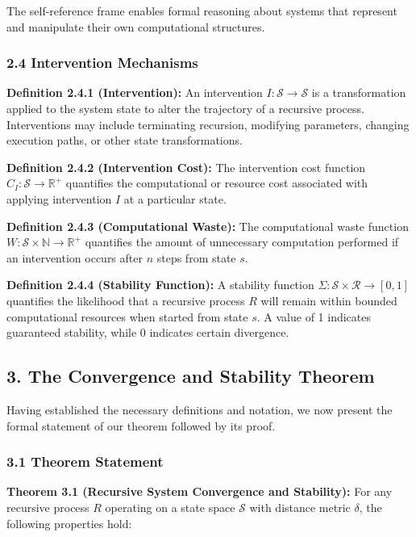 \documentclass[
]{article}
\begin{document}
The self-reference frame enables formal reasoning about systems that
represent and manipulate their own computational structures.

\subsubsection{2.4 Intervention
Mechanisms}\label{intervention-mechanisms}

\textbf{Definition 2.4.1 (Intervention):} An intervention
\(I: \mathcal{S} \rightarrow \mathcal{S}\) is a transformation applied
to the system state to alter the trajectory of a recursive process.
Interventions may include terminating recursion, modifying parameters,
changing execution paths, or other state transformations.

\textbf{Definition 2.4.2 (Intervention Cost):} The intervention cost
function \(C_I: \mathcal{S} \rightarrow \mathbb{R}^+\) quantifies the
computational or resource cost associated with applying intervention
\(I\) at a particular state.

\textbf{Definition 2.4.3 (Computational Waste):} The computational waste
function \(W: \mathcal{S} \times \mathbb{N} \rightarrow \mathbb{R}^+\)
quantifies the amount of unnecessary computation performed if an
intervention occurs after \(n\) steps from state \(s\).

\textbf{Definition 2.4.4 (Stability Function):} A stability function
\(\Sigma: \mathcal{S} \times \mathcal{R} \rightarrow [0,1]\) quantifies
the likelihood that a recursive process \(R\) will remain within bounded
computational resources when started from state \(s\). A value of 1
indicates guaranteed stability, while 0 indicates certain divergence.

\subsection{3. The Convergence and Stability
Theorem}\label{the-convergence-and-stability-theorem}

Having established the necessary definitions and notation, we now
present the formal statement of our theorem followed by its proof.

\subsubsection{3.1 Theorem Statement}\label{theorem-statement}

\textbf{Theorem 3.1 (Recursive System Convergence and Stability):} For
any recursive process \(R\) operating on a state space \(\mathcal{S}\)
with distance metric \(\delta\), the following properties hold:
\end{document}
